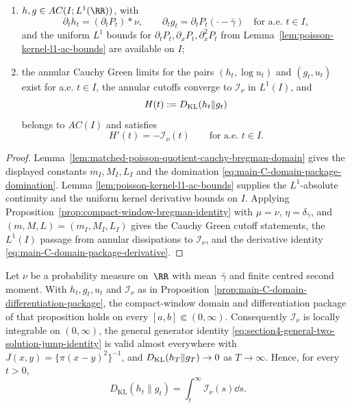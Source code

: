\begin{proposition}
\begin{enumerate}
\[
\int_I\mathcal I_\nu(t)\dd t\le \frac{4C_I}{\pi}|I|;
\]
\item \(h,g\in AC(I;L^1(\RR))\), with
\[
\partial_t h_t=(\partial_tP_t)*\nu,\qquad
\partial_t g_t=\partial_tP_t(\cdot-\bar\gamma)
\quad\text{for a.e. }t\in I,
\]
and the uniform \(L^1\) bounds for
\(\partial_tP_t,\partial_xP_t,\partial_x^2P_t\) from
Lemma~\ref{lem:poisson-kernel-l1-ac-bounds} are available on \(I\);
\item the annular Cauchy Green limits for the pairs
\((h_t,\log u_t)\) and \((g_t,u_t)\) exist for a.e. \(t\in I\), the annular
cutoffs converge to \(\mathcal I_\nu\) in \(L^1(I)\), and
\[
H(t):=D_{\rm KL}(h_t\|g_t)
\]
belongs to \(AC(I)\) and satisfies
\begin{equation}\label{eq:main-C-domain-package-derivative}
H'(t)=-\mathcal I_\nu(t)
\qquad\text{for a.e. }t\in I .
\end{equation}
\end{enumerate}
\end{proposition}

\begin{proof}
Lemma~\ref{lem:matched-poisson-quotient-cauchy-bregman-domain} gives the
displayed constants \(m_I,M_I,L_I\) and the domination
\eqref{eq:main-C-domain-package-domination}.  Lemma
\ref{lem:poisson-kernel-l1-ac-bounds} supplies the \(L^1\)-absolute
continuity and the uniform kernel derivative bounds on \(I\).  Applying
Proposition~\ref{prop:compact-window-bregman-identity} with
\(\mu=\nu\), \(\eta=\delta_{\bar\gamma}\), and
\((m,M,L)=(m_I,M_I,L_I)\) gives the Cauchy Green cutoff statements, the
\(L^1(I)\) passage from annular dissipations to \(\mathcal I_\nu\), and the
derivative identity \eqref{eq:main-C-domain-package-derivative}.
\end{proof}

\begin{theorem}%
\label{thm:poisson-kl-doob-tail}
\label{cor:poisson-kl-doob-bregman-tail}
Let $\nu$ be a probability measure on~$\RR$ with mean~$\bar{\gamma}$ and finite
centred second moment.  With \(h_t,g_t,u_t\) and \(\mathcal I_\nu\) as in
Proposition~\ref{prop:main-C-domain-differentiation-package}, the compact-window
domain and differentiation package of that proposition holds on every
\([a,b]\Subset(0,\infty)\).  Consequently \(\mathcal I_\nu\) is locally
integrable on \((0,\infty)\), the general generator identity
\eqref{eq:section4-general-two-solution-jump-identity} is valid almost
everywhere with \(J(x,y)=\{\pi(x-y)^2\}^{-1}\), and
\(D_{\rm KL}(h_T\|g_T)\to0\) as \(T\to\infty\).  Hence, for every \(t>0\),
\begin{equation}\label{eq:relative-entropy-integrated-dissipation}
D_{\mathrm{KL}}(h_t\|g_t)=\int_t^\infty \mathcal I_\nu(s)\dd s.
\end{equation}
\end{theorem}

